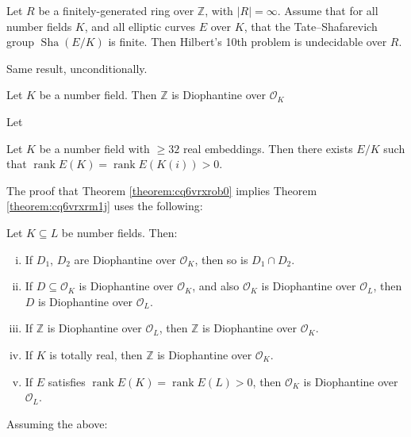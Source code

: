 \documentclass[reqno]{amsart} 
\begin{document}
\begin{theorem}
  Let $R$ be a finitely-generated ring over $\mathbb{Z}$, with $\lvert R \rvert = \infty$.  Assume that for all number fields $K$, and all elliptic curves $E$ over $K$, that the Tate--Shafarevich group $\operatorname{Sha}(E/K)$ is finite.  Then Hilbert's 10th problem is undecidable over $R$.
\end{theorem}
\begin{theorem}\label{theorem:cq6vrxrm1j}
  Same result, unconditionally.  
\end{theorem}
\begin{theorem}\label{theorem:cq6vrxro7z}
  Let $K$ be a number field.  Then $\mathbb{Z}$ is Diophantine over $\mathcal{O}_K$
\end{theorem}
Let
\begin{theorem}\label{theorem:cq6vrxrob0}
  Let $K$ be a number field with $\geq 32$ real embeddings.  Then there exists $E/K$ such that $\operatorname{rank} E(K)  = \operatorname{rank} E(K(i)) > 0$.
\end{theorem}
The proof that Theorem \ref{theorem:cq6vrxrob0} implies Theorem \ref{theorem:cq6vrxrm1j} uses the following:
\begin{lemma}
  Let $K \subseteq L$ be number fields.  Then:
  \begin{enumerate}[(i)]
  \item\label{enumerate:cq6vr0vqg9} If $D_1$, $D_2$ are Diophantine over $\mathcal{O}_K$, then so is $D_1 \cap D_2$.
  \item\label{enumerate:cq6vr0zdtm} If $D \subseteq \mathcal{O}_K$ is Diophantine over $\mathcal{O}_K$, and also $\mathcal{O}_K$ is Diophantine over $\mathcal{O}_L$, then $D$ is Diophantine over $\mathcal{O}_L$.
  \item\label{enumerate:cq6vrx9ccs} If $\mathbb{Z}$ is Diophantine over $\mathcal{O}_L$, then $\mathbb{Z}$ is Diophantine over $\mathcal{O}_K$.
  \item\label{enumerate:cq6vr0ybj9} If $K$ is totally real, then $\mathbb{Z}$ is Diophantine over $\mathcal{O}_K$.
  \item\label{enumerate:cq6vr0twgm} If $E$ satisfies $\operatorname{rank} E(K) = \operatorname{rank} E(L) > 0$, then $\mathcal{O}_K$ is Diophantine over $\mathcal{O}_L$.
  \end{enumerate}
\end{lemma}
Assuming the above:
\end{document}
